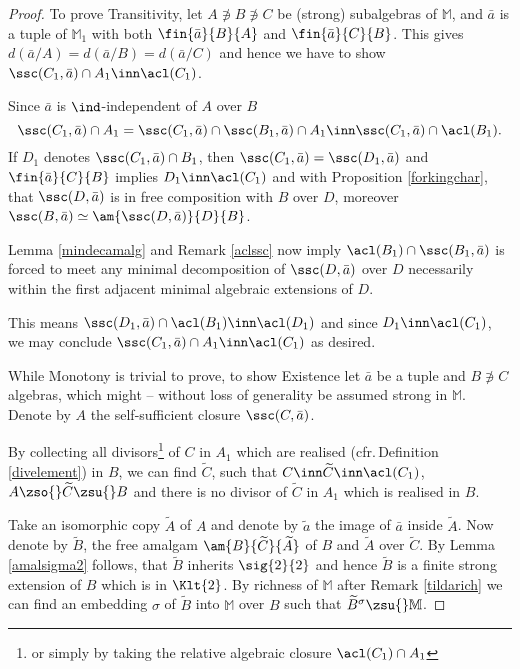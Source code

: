 \begin{proof}
To prove {\small\sc Transitivity}, let $A\nni B\nni C$ be (strong) subalgebras of $\mathbb{M}$, and $\bar a$ is a tuple of $\mathbb{M}_{1}$ with both $\fin{\bar a}{B}{A}$ and $\fin{\bar a}{C}{B}$. This gives $d(\bar a/A)=d(\bar a/B)=d(\bar a/C)$ and hence we have to
show $\ssc(C_{1},\bar a)\cap A_{1}\inn\acl(C_{1})$.

Since $\bar a$ is $\ind$-independent of $A$ over $B$
$$\ssc(C_{1},\bar a)\cap A_{1}=\ssc(C_{1},\bar a)\cap\ssc(B_{1},\bar a)\cap A_{1}\inn\ssc(C_{1},\bar a)
\cap\acl(B_{1}).$$
If $D_{1}$ denotes $\ssc(C_{1},\bar a)\cap B_{1}$, then $\ssc(C_{1},\bar a)=\ssc(D_{1},\bar a)$ and $\fin{\bar a}{C}{B}$
implies $D_{1}\inn\acl(C_{1})$ and
with Proposition \ref{forkingchar}, that $\ssc(D,\bar a)$ is in free composition with $B$ over $D$,
moreover $\ssc(B,\bar a)\simeq\am{\ssc(D,\bar a)}{D}{B}$.

Lemma \ref{mindecamalg} and Remark \ref{aclssc} now imply $\acl(B_{1})\cap\ssc(B_{1},\bar a)$ is forced to meet any minimal decomposition
of $\ssc(D,\bar a)$ over $D$ necessarily within the first adjacent minimal algebraic extensions of $D$.

This means $\ssc(D_{1},\bar a)\cap\acl(B_{1})%
\inn\acl(D_{1})$ and since $D_{1}\inn\acl(C_{1})$, we may
conclude $\ssc(C_{1},\bar a)\cap A_{1}\inn\acl(C_{1})$ as desired.

\medskip
While {\small\sc %
Monotony} is trivial to prove, to show {\small\sc Existence} let $\bar a$ be a tuple and
$B\nni C$ algebras, which might -- without loss of generality be assumed strong in $\mathbb{M}$. Denote
by $A$ the self-sufficient closure $\ssc(C,\bar a)$.

By collecting all divisors\footnote{
or simply by taking the relative algebraic closure $\acl(C_{1})\cap A_{1}$}
of $C$ in $A_{1}$ which are realised (cfr.\,Definition \ref{divelement}) in $B$, we can find $\widetilde{C}$, such that
$C\inn\widetilde{C}\inn\acl(C_{1})$, $A\zso{}\widetilde{C}\zsu{}B$ and there is no divisor of $\widetilde{C}$ in $A_{1}$ which
is realised in $B$. %

Take an isomorphic copy $\widetilde{A}$ of $A$ and denote by $\tilde a$ the
image of $\bar a$ inside $\widetilde{A}$. Now denote by $\widetilde{B}$, the free amalgam $\am{B}{\widetilde{C}}{\widetilde{A}}$ of $B$ and $\widetilde{A}$ over $\widetilde{C}$.
By Lemma \ref{amalsigma2} follows, that $\widetilde{B}$ inherits $\sig{2}{2}$ and hence $\widetilde{B}$ is a finite strong
extension of $B$ which is in $\Klt{2}$. By richness of $\mathbb{M}$ after Remark \ref{tildarich} we can find an embedding $\sigma$
of $\widetilde{B}$ into $\mathbb{M}$ over $B$ such that $\widetilde{B}^{\sigma}\zsu{}\mathbb{M}$.


\end{proof}

